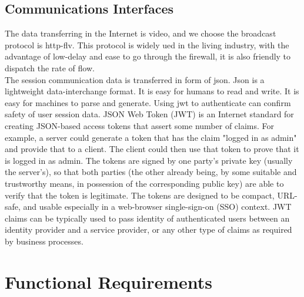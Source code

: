 \documentclass[16pt]{scrreprt}
\begin{document}
\subsection{Communications Interfaces}
The data transferring in the Internet is video, and we choose the broadcast protocol is http-flv. This protocol is widely ued in the living industry, with the advantage of low-delay and ease to go through the firewall, it is also friendly to dispatch the rate of flow. \\ 
The session communication data is transferred in form of json. Json is a lightweight data-interchange format. It is easy for humans to read and write. It is easy for machines to parse and generate. Using jwt to authenticate can confirm safety of user session data. JSON Web Token (JWT) is an Internet standard for creating JSON-based access tokens that assert some number of claims. For example, a server could generate a token that has the claim "logged in as admin" and provide that to a client. The client could then use that token to prove that it is logged in as admin. The tokens are signed by one party's private key (usually the server's), so that both parties (the other already being, by some suitable and trustworthy means, in possession of the corresponding public key) are able to verify that the token is legitimate. The tokens are designed to be compact, URL-safe, and usable especially in a web-browser single-sign-on (SSO) context. JWT claims can be typically used to pass identity of authenticated users between an identity provider and a service provider, or any other type of claims as required by business processes. \\

\clearpage
\section{Functional Requirements}
\end{document}
